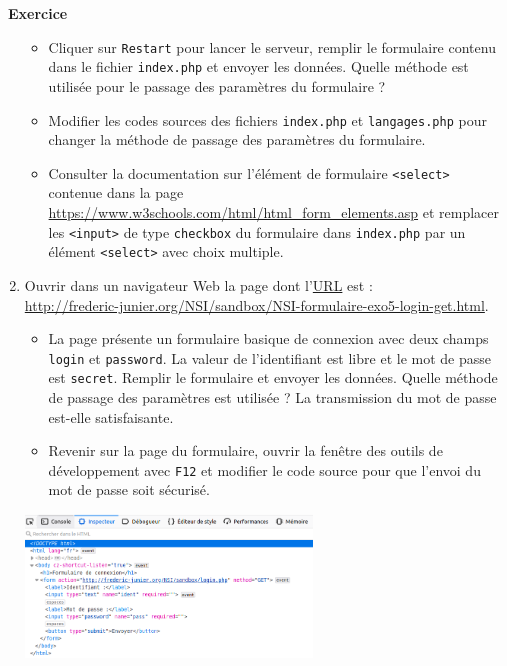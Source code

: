 \documentclass[
  11pt,
]{article}
\newcommand{\passthrough}[1]{#1}
\providecommand{\tightlist}{%
  \setlength{\itemsep}{0pt}\setlength{\parskip}{0pt}}
\newcounter{exo}
\newenvironment{exercice}[1]
{\par \medskip   \addtocounter{exo}{1} \noindent  
\begin{bclogo}[arrondi =0.1,   noborder = true, logo=\bccrayon, marge=4]{~\textbf{Exercice} \textbf{\theexo} {\itshape #1} }  \par}
{
\end{bclogo}
 \par \bigskip }
\newcounter{logi}
\begin{document}
\begin{exercice}{}
\begin{enumerate}
  \begin{itemize}
  \tightlist
  \item
    Cliquer sur \passthrough{\lstinline!Restart!} pour lancer le
    serveur, remplir le formulaire contenu dans le fichier
    \passthrough{\lstinline!index.php!} et envoyer les données. Quelle
    méthode est utilisée pour le passage des paramètres du formulaire ?
  \item
    Modifier les codes sources des fichiers
    \passthrough{\lstinline!index.php!} et
    \passthrough{\lstinline!langages.php!} pour changer la méthode de
    passage des paramètres du formulaire.
  \item
    Consulter la documentation sur l'élément de formulaire
    \passthrough{\lstinline!<select>!} contenue dans la page
    \url{https://www.w3schools.com/html/html_form_elements.asp} et
    remplacer les \passthrough{\lstinline!<input>!} de type
    \passthrough{\lstinline!checkbox!} du formulaire dans
    \passthrough{\lstinline!index.php!} par un élément
    \passthrough{\lstinline!<select>!} avec choix multiple.
  \end{itemize}
\item
  Ouvrir dans un navigateur Web la page dont
  l'\href{https://developer.mozilla.org/fr/docs/Glossaire/URL}{URL} est
  :\\
  \url{http://frederic-junier.org/NSI/sandbox/NSI-formulaire-exo5-login-get.html}.

  \begin{itemize}
  \tightlist
  \item
    La page présente un formulaire basique de connexion avec deux champs
    \passthrough{\lstinline!login!} et
    \passthrough{\lstinline!password!}. La valeur de l'identifiant est
    libre et le mot de passe est \passthrough{\lstinline!secret!}.
    Remplir le formulaire et envoyer les données. Quelle méthode de
    passage des paramètres est utilisée ? La transmission du mot de
    passe est-elle satisfaisante.
  \item
    Revenir sur la page du formulaire, ouvrir la fenêtre des outils de
    développement avec \passthrough{\lstinline!F12!} et modifier le code
    source pour que l'envoi du mot de passe soit sécurisé.
  \end{itemize}

  \includegraphics[width=0.6\textwidth,height=\textheight]{images/login.png}\\


\end{enumerate}
\end{exercice}
\end{document}
